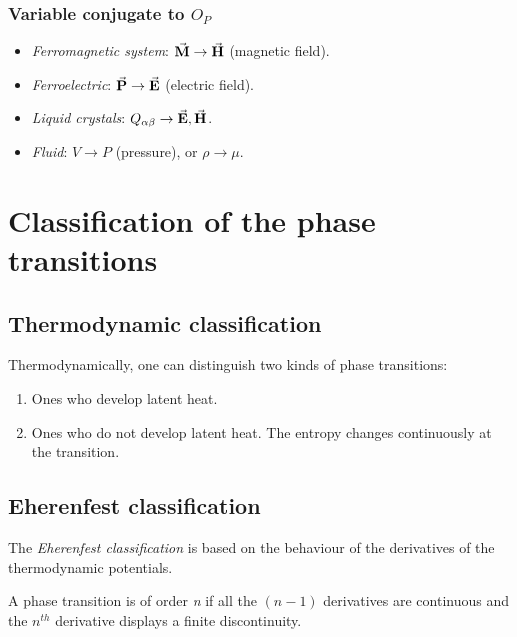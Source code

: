 \documentclass[../main/main.tex]{subfiles}
\begin{document}
\subsubsection{Variable conjugate to \( O_P \)}
\begin{itemize}
\item \emph{Ferromagnetic system}: \( \va{M} \rightarrow \va{H}   \) (magnetic field).
\item \emph{Ferroelectric}: \( \va{P} \rightarrow \va{E}   \)  (electric field).
\item \emph{Liquid crystals}: \( Q_{\alpha \beta } \rightarrow \va{E},\va{H}   \).
\item \emph{Fluid}: \( V \rightarrow P \) (pressure), or \( \rho \rightarrow \mu  \).
\end{itemize}









\section{Classification of the phase transitions}

\subsection{Thermodynamic classification}
Thermodynamically, one can distinguish two kinds of phase transitions:
\begin{enumerate}
\item Ones who develop latent heat.
\item Ones who do not develop latent heat. The entropy changes continuously at the transition.
\end{enumerate}
\subsection{Eherenfest classification}
The \emph{Eherenfest classification} is based on the behaviour of the derivatives of the thermodynamic potentials.

A phase transition is of order \emph{n} if all the \( (n-1) \)  derivatives are continuous and the \( n^{th} \) derivative displays a finite discontinuity.
\end{document}
